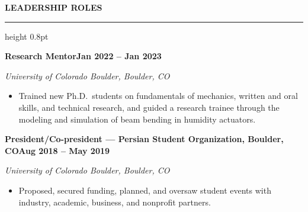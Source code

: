 \documentclass[10pt, letterpaper]{article}
\newcommand{\rsection}[1]{%
  \vspace{8pt}%
  {\large\bfseries\MakeUppercase{#1}}%
  \vspace{1pt}%
  \hrule height 0.8pt%
  \vspace{4pt}%
}
\newcommand{\jobline}[2]{%
  \vspace{5pt}%
  \noindent\textbf{#1}\hfill\textbf{#2}\par%
  \vspace{1pt}%
}
\newcommand{\subline}[1]{%
  \vspace{-1pt}%
  \noindent\textit{#1}\par%
  \vspace{1pt}%
}
\newenvironment{rlist}{%
  \begin{itemize}[leftmargin=1.4em, itemsep=1pt, topsep=2pt, parsep=0pt]%
}{%
  \end{itemize}%
}
\begin{document}

\rsection{Leadership Roles}

\jobline{Research Mentor}{Jan 2022 -- Jan 2023}
\subline{University of Colorado Boulder, Boulder, CO}
\begin{rlist}
  \item Trained new Ph.D.\ students on fundamentals of mechanics, written and oral skills, and technical research, and guided a research trainee through the modeling and simulation of beam bending in humidity actuators.
\end{rlist}

\jobline{President/Co-president --- Persian Student Organization, Boulder, CO}{Aug 2018 -- May 2019}
\subline{University of Colorado Boulder, Boulder, CO}
\begin{rlist}
  \item Proposed, secured funding, planned, and oversaw student events with industry, academic, business, and nonprofit partners.
\end{rlist}
\end{document}
